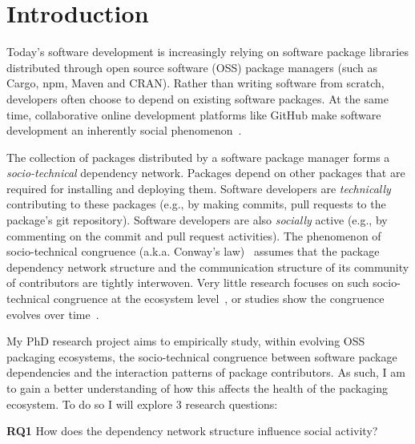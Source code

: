 \section{Introduction}
\label{sec:intro}

Today's software development is increasingly relying on software package libraries distributed through open source software (OSS) package managers (such as Cargo, npm, Maven and CRAN). Rather than writing software from scratch, developers often choose to depend on existing software packages.
At the same time, collaborative online development platforms like GitHub make software development an inherently social phenomenon~\cite{DabbishSTH12,Mens2019IEEESW}.

The collection of packages distributed by a software package manager forms a \emph{socio-technical} dependency network. Packages depend on other packages that are required for installing and deploying them. Software developers are \emph{technically} contributing to these packages (e.g., by making commits, pull requests to the package's git repository). Software developers are also \emph{socially} active (e.g., by commenting on the commit and pull request activities).
The phenomenon of socio-technical congruence (a.k.a. Conway's law)~\cite{Conway1968, Herbsleb1999} assumes
that the package dependency network structure and the communication structure of its community of contributors are tightly interwoven. Very little research focuses on such socio-technical congruence at the ecosystem level~\cite{Palyart2018TSE}, or studies show the congruence evolves over time~\cite{Cataldo2008}.

My PhD research project %
aims to empirically study, within evolving OSS packaging ecosystems, the socio-technical congruence between software package dependencies and the interaction patterns of package contributors. As such, I am to gain a better understanding of how this affects the health of the packaging ecosystem.
To do so %
I will explore 3 research questions: 

\noindent \textbf{RQ1} How does the dependency network structure influence social activity? %

